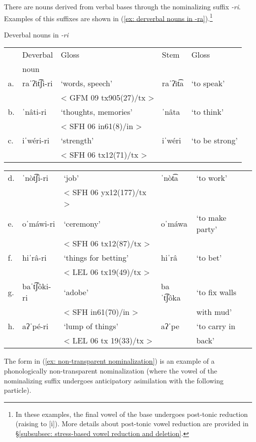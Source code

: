 There are nouns derived from verbal bases through the nominalizing suffix \textit{-ri}. Examples of this suffixes are shown in (\ref{ex: derverbal nouns in -ra}).\footnote{In these examples, the final vowel of the base undergoes post-tonic reduction (raising to [i]). More details about post-tonic vowel reduction are provided in §\ref{subsubsec: stress-based vowel reduction and deletion}.}

\ea\label{ex: derverbal nouns in -ra}
{Deverbal nouns in \textit{-ri}}\\

\begin{tabular}{lllll}
        &  {Deverbal} &   {Gloss} &  {Stem} &  {Gloss}\\
        &  {noun} \\
     a.& raˈʔìt͡ʃi-ri & `words, speech' & raˈʔìt͡a & `to speak' \\
      & &  < GFM 09 tx905(27)/tx >\\
     b.& ˈnâti-ri  & `thoughts, memories' & ˈnâta & `to think'\\
     & &  < SFH 06 in61(8)/in >\\
     c.& iˈwéri-ri &  `strength' &  iˈwéri & `to be strong' \\
      &   & < SFH 06 tx12(71)/tx > \\
     \end{tabular}

\begin{tabular}{lllll}
     d.& ˈnòt͡ʃi-ri & `job' & ˈnòt͡a & `to work' \\
      & & < SFH 06 yx12(177)/tx >\\
     e.& oˈmáwi-ri & ‘ceremony’ & oˈmáwa & `to make party' \\
       & & < SFH 06 tx12(87)/tx > \\
     f.& hiˈrâ-ri & ‘things for betting’ & hiˈrâ & ‘to bet’ \\
       & &  < LEL 06 tx19(49)/tx >\\
     g.& baˈt͡ʃôki-ri & `adobe’ & baˈt͡ʃôka &  ‘to fix walls \\
       & &  < SFH in61(70)/in > &  & with mud'\\
     h.& aʔˈpé-ri & ‘lump of things’ & aʔˈpe &  ‘to carry in  \\
       & &  < LEL 06 tx 19(33)/tx > & & back’\\
\end{tabular}
    \z

The form in (\ref{ex: non-transparent nominalization}) is an example of a phonologically non-transparent nominalization (where the vowel of the nominalizing suffix undergoes anticipatory asimilation with the following particle).

